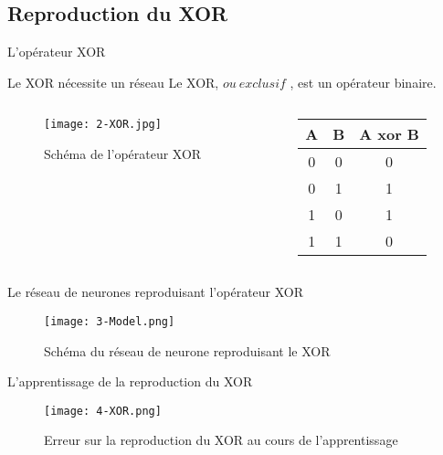 \subsection{Reproduction du XOR}

\begin{frame}{L'opérateur XOR}
	\begin{block}{Le XOR nécessite un réseau}
		Le XOR, \og $ou\ exclusif$ \fg, est un opérateur binaire. \\
	\end{block}
    \begin{columns}
        \begin{column}{0.6\textwidth}
            \begin{figure}
                \centering
                \texttt{[image: 2-XOR.jpg]}
                \caption{Schéma de l'opérateur XOR}
            \end{figure}
        \end{column}
        \begin{column}[]{0.3\textwidth}
            \begin{center}
                \begin{tabular}{|c c | c|}
                    \hline
                    A & B & A xor B \\ \hline
                    0 & 0 & 0 \\
                    0 & 1 & 1 \\
                    1 & 0 & 1 \\
                    1 & 1 & 0 \\
                    \hline
                \end{tabular}
                \end{center}
        \end{column}
    \end{columns}
\end{frame}



\begin{frame}{Le réseau de neurones reproduisant l'opérateur XOR}
	\begin{figure}
		\centering
		\texttt{[image: 3-Model.png]}
		\caption{Schéma du réseau de neurone reproduisant le XOR}
	\end{figure}
\end{frame}

\begin{frame}{L'apprentissage de la reproduction du XOR}
	\begin{figure}
		\centering
		\texttt{[image: 4-XOR.png]}
		\caption{Erreur sur la reproduction du XOR au cours de l'apprentissage}
	\end{figure}
\end{frame}


